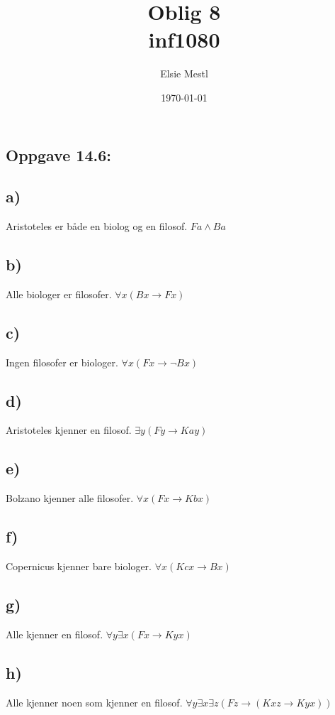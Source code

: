 \documentclass[a4paper, norsk, 10pt]{article}
\date{\today}
\title{Oblig 8 \\ inf1080}
\author{Elsie Mestl}
\begin{document}
\maketitle
\begin{flushleft}

  \section*{Oppgave 14.6:}

  \subsection*{a)}
  Aristoteles er både en biolog og en filosof. \quad $Fa \land Ba$
  
  \subsection*{b)}
  Alle biologer er filosofer. \quad $\forall x(Bx \rightarrow Fx)$
  
  \subsection*{c)}
  Ingen filosofer er biologer. \quad $\forall x(Fx \rightarrow \neg Bx)$
  
  \subsection*{d)}
  Aristoteles kjenner en filosof. \quad $\exists y (Fy \rightarrow Kay)$
  
  \subsection*{e)}
  Bolzano kjenner alle filosofer. \quad $\forall x (Fx \rightarrow Kbx)$
  
  \subsection*{f)}
  Copernicus kjenner bare biologer. \quad $\forall x (Kcx \rightarrow Bx)$
  
  \subsection*{g)}
  Alle kjenner en filosof. \quad $\forall y \exists x (Fx \rightarrow Kyx)$
  
  \subsection*{h)}
  Alle kjenner noen som kjenner en filosof. \quad $\forall y \exists x \exists z (Fz \rightarrow (Kxz \rightarrow Kyx))$ 
  

\end{flushleft}
\end{document}
